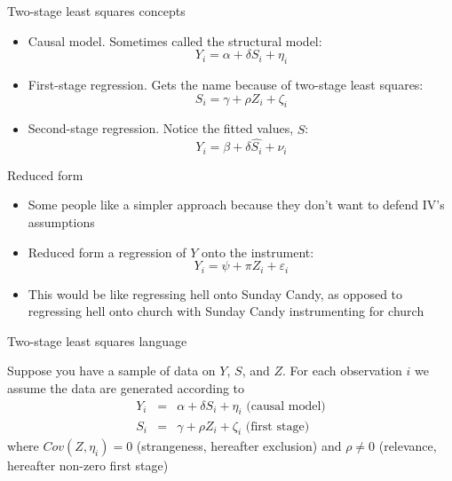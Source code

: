 \documentclass{beamer}
\begin{document}
\begin{frame}{Two-stage least squares concepts}
	
	\begin{itemize}
	\item Causal model.  Sometimes called the structural model:$$Y_i=\alpha + \delta{S_i} + \eta_i$$
	\item First-stage regression. Gets the name because of two-stage least squares:$$S_i = \gamma + \rho{Z_i} + \zeta_i$$
	\item Second-stage regression. Notice the fitted values, $\widehat{S}$:$$Y_i=\beta + \delta{\widehat{S_i}}+\nu_i$$
	\end{itemize}
\end{frame}


\begin{frame}{Reduced form}

\begin{itemize}
\item Some people like a simpler approach because they don't want to defend IV's assumptions
\item Reduced form a regression of $Y$ onto the instrument:$$Y_i=\psi + \pi{Z_i} + \varepsilon_i$$
\item This would be like regressing hell onto Sunday Candy, as opposed to regressing hell onto church with Sunday Candy instrumenting for church
\end{itemize}

\end{frame}






\begin{frame}{Two-stage least squares language}

Suppose you have a sample of data on $Y$, $S$, and $Z$. For each observation $i$ we assume the data are generated according to
		\begin{eqnarray*}
		Y_i &=& \alpha + \delta{S}_i + \eta_i \text{ (causal model)}\\
		S_i &=& \gamma + \rho{Z}_i + \zeta_i \text{ (first stage)} 
		\end{eqnarray*}where $Cov(Z,\eta_i)=0$ (strangeness, hereafter exclusion) and $\rho\neq{0}$ (relevance, hereafter non-zero first stage)

\end{frame}
\end{document}
